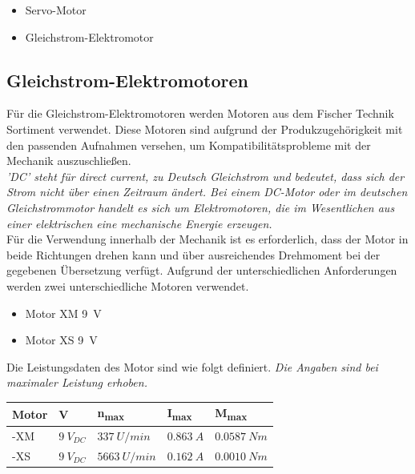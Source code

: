 \documentclass[conference,compsoc,final,a4paper]{IEEEtran}
\begin{document}
\begin{itemize}
	\item Servo-Motor
	\item Gleichstrom-Elektromotor
\end{itemize}

\subsection{Gleichstrom-Elektromotoren}
\noindent Für die Gleichstrom-Elektromotoren werden Motoren aus dem Fischer Technik Sortiment verwendet. 
Diese Motoren sind aufgrund der Produkzugehörigkeit mit den passenden Aufnahmen versehen, um Kompatibilitätsprobleme mit der Mechanik auszuschließen.
\\


\textit{’DC’ steht für direct current, zu Deutsch Gleichstrom und bedeutet, dass sich der Strom nicht über einen Zeitraum ändert. Bei einem DC-Motor oder im deutschen Gleichstrommotor handelt es sich um Elektromotoren, die im Wesentlichen aus
einer elektrischen eine mechanische Energie erzeugen.} \autocite{metzgerkonzepte}
\\


\noindent Für die Verwendung innerhalb der Mechanik ist es erforderlich, dass der Motor in beide Richtungen drehen kann und über ausreichendes Drehmoment bei der gegebenen Übersetzung verfügt.
Aufgrund der unterschiedlichen Anforderungen werden zwei unterschiedliche Motoren verwendet.
\begin{itemize}
\item Motor XM \qty{9}{V}
\item Motor XS \qty{9}{V}
\end{itemize}

\noindent Die Leistungsdaten des Motor sind wie folgt definiert. 
\newline \textit{Die Angaben sind bei maximaler Leistung erhoben.}

\begin{table}[h]
  \begin{tabular}{lllll}
      \textbf{Motor} & \textbf{V} & \textbf{n\textsubscript{max}} & \textbf{I\textsubscript{max}} & \textbf{M\textsubscript{max}} \\ \hline
      -XM \autocite{motorenXM} & $\qty{9}{V}_{DC}$ & $\qty{337}{U/min}$ & $\qty{0.863}{A}$ & $\qty{0.0587}{Nm}$ \\ 
      -XS \autocite{motorenXS} & $\qty{9}{V}_{DC}$ & $\qty{5663}{U/min}$ & $\qty{0.162}{A}$ & $\qty{0.0010}{Nm}$ \\
  \end{tabular}
  \end{table}
  
\end{document}
